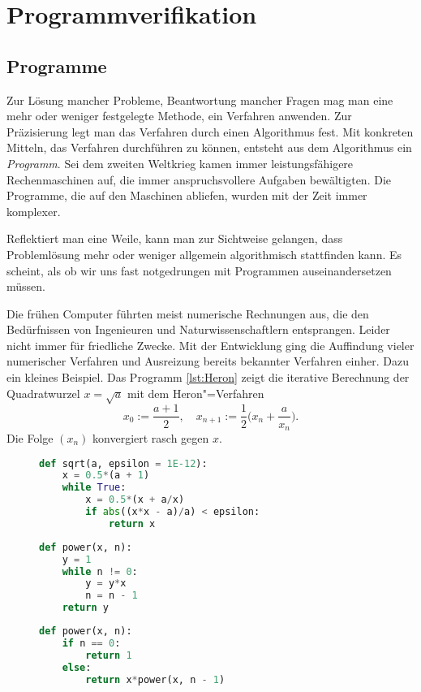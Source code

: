 
\chapter{Programmverifikation}

\section{Programme}

Zur Lösung mancher Probleme, Beantwortung mancher Fragen mag man eine
mehr oder weniger festgelegte Methode, ein Verfahren anwenden.
Zur Präzisierung legt man das Verfahren durch einen Algorithmus fest.
Mit konkreten Mitteln, das Verfahren durchführen zu können, entsteht
aus dem Algorithmus ein \emph{Programm}. Sei dem zweiten Weltkrieg kamen
immer leistungsfähigere Rechenmaschinen auf, die immer anspruchsvollere
Aufgaben bewältigten. Die Programme, die auf den Maschinen abliefen,
wurden mit der Zeit immer komplexer.

Reflektiert man eine Weile, kann man zur Sichtweise gelangen, dass
Problemlösung mehr oder weniger allgemein algorithmisch stattfinden
kann. Es scheint, als ob wir uns fast notgedrungen mit Programmen
auseinandersetzen müssen.

Die frühen Computer führten meist numerische Rechnungen aus, die den
Bedürfnissen von Ingenieuren und Naturwissenschaftlern entsprangen.
Leider nicht immer für friedliche Zwecke. Mit der Entwicklung ging
die Auffindung vieler numerischer Verfahren und Ausreizung bereits
bekannter Verfahren einher. Dazu ein kleines Beispiel. Das Programm
\ref{lst:Heron} zeigt die iterative Berechnung der Quadratwurzel $x=\sqrt{a}$
mit dem Heron"=Verfahren
\[x_0 := \frac{a + 1}{2},\quad x_{n+1} := \frac{1}{2}\Big(x_n + \frac{a}{x_n}\Big).\]
Die Folge $(x_n)$ konvergiert rasch gegen $x$.

\begin{figure}
\begin{lstlisting}[language=Python,%
label=lst:Heron,
caption={Programm zur iterativen Berechnung von Quadratwurzeln}]
def sqrt(a, epsilon = 1E-12):
    x = 0.5*(a + 1)
    while True:
        x = 0.5*(x + a/x)
        if abs((x*x - a)/a) < epsilon:
            return x
\end{lstlisting}
\begin{minipage}[t]{.48\textwidth}
\begin{lstlisting}[language=Python,%
label=lst:Potenz,%
caption={\raggedright Programm zur iterativen Berechnung der Potenz $x^n$}]
def power(x, n):
    y = 1
    while n != 0:
        y = y*x
        n = n - 1
    return y
\end{lstlisting}
\end{minipage}
\hfill
\begin{minipage}[t]{.48\textwidth}
\begin{lstlisting}[language=Python,%
caption={\raggedright Programm zur rekursiven Berechnung der Potenz $x^n$}]
def power(x, n):
    if n == 0:
        return 1
    else:
        return x*power(x, n - 1)
\end{lstlisting}
\end{minipage}
\end{figure}

